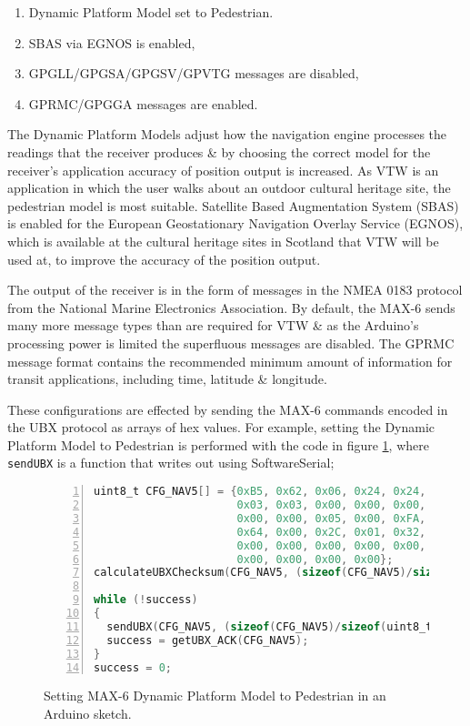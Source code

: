 \begin{enumerate}
	\item Dynamic Platform Model set to Pedestrian.
	\item SBAS via EGNOS is enabled,
	\item GPGLL/GPGSA/GPGSV/GPVTG messages are disabled,
	\item GPRMC/GPGGA messages are enabled.
\end{enumerate}

The Dynamic Platform Models adjust how the navigation engine processes the readings that the receiver produces \& by choosing the correct model for the receiver's application accuracy of position output is increased. As VTW is an application in which the user walks about an outdoor cultural heritage site, the pedestrian model is most suitable. Satellite Based Augmentation System (SBAS) is enabled for the European Geostationary Navigation Overlay Service (EGNOS), which is available at the cultural heritage sites in Scotland that VTW will be used at, to improve the accuracy of the position output.

The output of the receiver is in the form of messages in the NMEA 0183 protocol from the National Marine Electronics Association. By default, the MAX-6 sends many more message types than are required for VTW \& as the Arduino's processing power is limited the superfluous messages are disabled. The GPRMC message format contains the recommended minimum amount of information for transit applications, including time, latitude \& longitude.

These configurations are effected by sending the MAX-6 commands encoded in the UBX protocol as arrays of hex values. For example, setting the Dynamic Platform Model to Pedestrian is performed with the code in figure \ref{arduinoMAX6hex}, where \texttt{sendUBX} is a function that writes out using SoftwareSerial;

\begin{figure}[h]
\begin{lstlisting}[language=C, numbers=left, numberstyle=\small, stepnumber=1, frame=single, breaklines=true, backgroundcolor=\color{codebackground}, showstringspaces=false]
uint8_t CFG_NAV5[] = {0xB5, 0x62, 0x06, 0x24, 0x24, 0x00, 0xFF, 0xFF,
                      0x03, 0x03, 0x00, 0x00, 0x00, 0x00, 0x10, 0x27,
                      0x00, 0x00, 0x05, 0x00, 0xFA, 0x00, 0xFA, 0x00,
                      0x64, 0x00, 0x2C, 0x01, 0x32, 0x3C, 0x00, 0x00,
                      0x00, 0x00, 0x00, 0x00, 0x00, 0x00, 0x00, 0x00,
                      0x00, 0x00, 0x00, 0x00};
calculateUBXChecksum(CFG_NAV5, (sizeof(CFG_NAV5)/sizeof(uint8_t)));

while (!success)
{
  sendUBX(CFG_NAV5, (sizeof(CFG_NAV5)/sizeof(uint8_t)));
  success = getUBX_ACK(CFG_NAV5);
}
success = 0;
\end{lstlisting}
\caption{Setting MAX-6 Dynamic Platform Model to Pedestrian in an Arduino sketch.}
\label{arduinoMAX6hex}
\end{figure}

